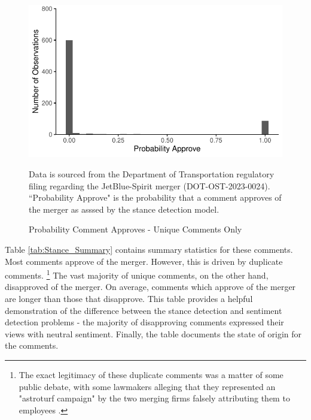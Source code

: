 \documentclass{article}
\begin{document}
\begin{appendices}
	\begin{figure}
		\caption{Probability Comment Approves - Unique Comments Only}
		\label{fig:ProbabilityApprove_Unique}
        \begin{center}
            \includegraphics{05.Figures/stance_strength_unique.pdf}
        \end{center}
				\begin{minipage}{\textwidth} 
			{\footnotesize Data is sourced from the Department of Transportation regulatory filing regarding the JetBlue-Spirit merger (DOT-OST-2023-0024). ``Probability Approve" is the probability that a comment approves of the merger as asssed by the stance detection model.} 
		\end{minipage}
	\end{figure}


Table \ref{tab:Stance_Summary} contains summary statistics for these comments. Most comments approve of the merger. However, this is driven by duplicate comments. \footnote{The exact legitimacy of these duplicate comments was a matter of some public debate, with some lawmakers alleging that they represented an "astroturf campaign" by the two merging firms falsely attributing them to employees \citep{birnbaum_elizabeth_2023}.}  The vast majority of unique comments, on the other hand, disapproved of the merger. On average, comments which approve of the merger are longer than those that disapprove. This table provides a helpful demonstration of the difference between the stance detection and sentiment detection problems -  the majority of disapproving comments expressed their views with neutral sentiment. Finally, the table documents the state of origin for the comments. 


\end{appendices}
\end{document}
